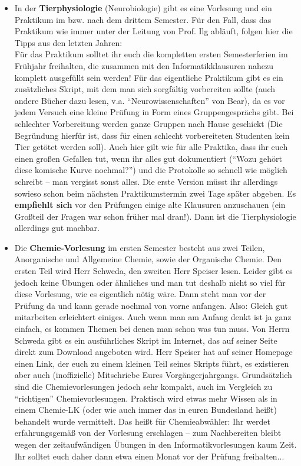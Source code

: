 \begin{itemize}
\item In der \textbf{Tierphysiologie} (Neurobiologie) gibt es eine Vorlesung und ein
     Praktikum im bzw. nach dem drittem Semester. Für den Fall, dass das Praktikum wie immer unter der Leitung von Prof. Ilg abläuft, folgen hier die Tipps aus den letzten Jahren:\\
     Für das Praktikum solltet
     ihr euch die kompletten ersten Semesterferien im Frühjahr freihalten, die zusammen
     mit den Informatikklausuren nahezu komplett ausgefüllt sein werden!
     Für das eigentliche Praktikum gibt es ein zusätzliches Skript, mit
     dem man sich sorgfältig vorbereiten sollte (auch andere Bücher
     dazu lesen, v.a. "`Neurowissenschaften"' von Bear), da es vor jedem Versuch eine kleine
     Prüfung in Form eines Gruppengesprächs gibt.  Bei schlechter
     Vorbereitung werden ganze Gruppen nach Hause geschickt (Die
     Begründung hierfür ist, dass für einen schlecht vorbereiteten
     Studenten kein Tier getötet werden soll\textellipsis).  Auch hier gilt
     wie für alle Praktika, dass ihr euch einen großen Gefallen
     tut, wenn ihr alles gut dokumentiert ("`Wozu gehört diese
     komische Kurve nochmal?"') und die Protokolle so schnell wie
     möglich schreibt -- man vergisst
     sonst alles.  Die erste Version müsst ihr allerdings sowieso
     schon beim nächsten Praktikumstermin zwei Tage später
     abgeben. Es \textbf{empfiehlt sich} vor den Prüfungen einige alte Klausuren
     anzuschauen (ein Großteil der Fragen war schon früher mal dran!).
     Dann ist die Tierphysiologie allerdings gut machbar.

 \item Die \textbf{Chemie-Vorlesung} im ersten Semester besteht aus zwei Teilen,
     Anorganische und Allgemeine Chemie, sowie der Organische Chemie. Den ersten
     Teil wird Herr Schweda, den zweiten Herr Speiser lesen.
     Leider gibt es jedoch keine Übungen oder ähnliches und man tut deshalb nicht so
     viel für diese Vorlesung, wie es eigentlich nötig wäre.
     Dann steht man vor der Prüfung da
     und kann gerade nochmal von vorne anfangen. Also: Gleich gut
     mitarbeiten erleichtert einiges. Auch wenn man am Anfang denkt
     ist ja ganz einfach, es kommen Themen bei denen man schon was tun
     muss.
     Von Herrn Schweda gibt es ein ausführliches Skript im Internet, das auf seiner Seite
     direkt zum Download angeboten wird. Herr Speiser hat auf seiner Homepage einen Link,
     der euch zu einem kleinen Teil seines Skripts führt, es existieren aber auch (inoffizielle)
     Mitschriebe Eures Vorgängerjahrgangs.
     Grundsätzlich sind die Chemievorlesungen jedoch sehr kompakt, auch im
     Vergleich zu "`richtigen"' Chemievorlesungen. Praktisch wird etwas mehr
     Wissen als in einem Chemie-LK (oder wie auch immer das in euren Bundesland heißt)
     behandelt wurde vermittelt. Das heißt für Chemieabwähler: Ihr werdet
     erfahrungsgemäß von der Vorlesung erschlagen -- zum Nachbereiten bleibt
     wegen der zeitaufwändigen Übungen in den Informatikvorlesungen kaum Zeit.
     Ihr solltet euch daher dann etwa einen Monat vor der Prüfung freihalten...


\end{itemize}
